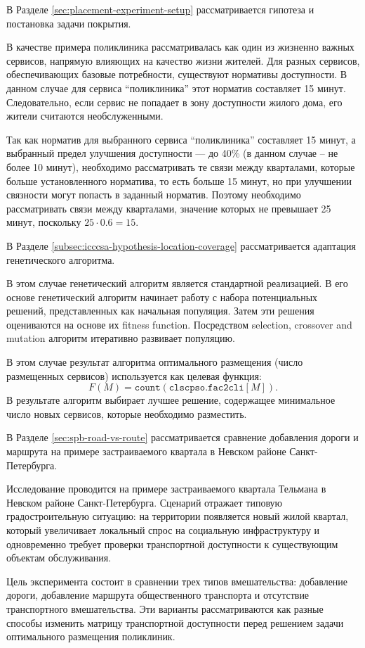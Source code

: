В Разделе \ref{sec:placement-experiment-setup} рассматривается гипотеза и постановка задачи покрытия.

В качестве примера поликлиника рассматривалась как один из жизненно важных сервисов, напрямую влияющих на качество жизни жителей. Для разных сервисов, обеспечивающих базовые потребности, существуют нормативы доступности. В данном случае для сервиса ``поликлиника'' этот норматив составляет 15 минут. Следовательно, если сервис не попадает в зону доступности жилого дома, его жители считаются необслуженными.

Так как норматив для выбранного сервиса ``поликлиника'' составляет 15 минут, а выбранный предел улучшения доступности --- до 40\% (в данном случае -- не более 10 минут), необходимо рассматривать те связи между кварталами, которые больше установленного норматива, то есть больше 15 минут, но при улучшении связности могут попасть в заданный норматив. Поэтому необходимо рассматривать связи между кварталами, значение которых не превышает 25 минут, поскольку \(25 \cdot 0.6 = 15\).

В Разделе \ref{subsec:icccsa-hypothesis-location-coverage} рассматривается адаптация генетического алгоритма.

В этом случае генетический алгоритм является стандартной реализацией. В его основе генетический алгоритм начинает работу с набора потенциальных решений, представленных как начальная популяция. Затем эти решения оцениваются на основе их fitness function. Посредством selection, crossover and mutation алгоритм итеративно развивает популяцию.

В этом случае результат алгоритма оптимального размещения (число размещенных сервисов) используется как целевая функция:
\[
F(M)=\texttt{count}(\texttt{clscpso.fac2cli}[M]).
\]
В результате алгоритм выбирает лучшее решение, содержащее минимальное число новых сервисов, которые необходимо разместить.


В Разделе \ref{sec:spb-road-vs-route} рассматривается сравнение добавления дороги и маршрута на примере застраиваемого квартала в Невском районе Санкт-Петербурга.

Исследование проводится на примере застраиваемого квартала Тельмана в Невском районе Санкт-Петербурга. Сценарий отражает типовую градостроительную ситуацию: на территории появляется новый жилой квартал, который увеличивает локальный спрос на социальную инфраструктуру и одновременно требует проверки транспортной доступности к существующим объектам обслуживания.

Цель эксперимента состоит в сравнении трех типов вмешательства: добавление дороги, добавление маршрута общественного транспорта и отсутствие транспортного вмешательства. Эти варианты рассматриваются как разные способы изменить матрицу транспортной доступности перед решением задачи оптимального размещения поликлиник.


